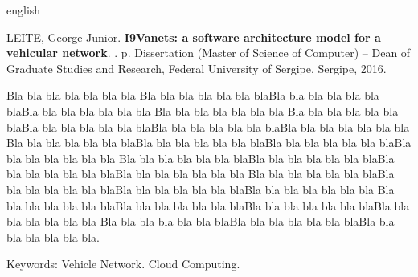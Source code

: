 \documentclass[
	12pt,				%
	oneside,			%
	a4paper,			%
	english,			%
	brazil				%
	]{abntex2ppgsi}
\begin{document}
% 
% 
\begin{resumo}[Abstract]
\begin{otherlanguage*}{english}

% 
%
%
%
\begin{flushleft}
LEITE, George Junior. \textbf{I9Vanets: a software architecture model for a vehicular network}. \imprimirdata. \pageref{LastPage} p. Dissertation (Master of Science of Computer) – Dean of Graduate Studies and Research, Federal University of Sergipe, Sergipe, 2016. 
\end{flushleft}

Bla bla bla bla bla bla bla Bla bla bla bla bla bla blaBla bla bla bla bla bla blaBla bla bla bla bla bla bla Bla bla bla bla bla bla bla Bla bla bla bla bla bla blaBla bla bla bla bla bla blaBla bla bla bla bla bla blaBla bla bla bla bla bla bla Bla bla bla bla bla bla blaBla bla bla bla bla bla blaBla bla bla bla bla bla blaBla bla bla bla bla bla bla Bla bla bla bla bla bla blaBla bla bla bla bla bla blaBla bla bla bla bla bla blaBla bla bla bla bla bla bla Bla bla bla bla bla bla blaBla bla bla bla bla bla blaBla bla bla bla bla bla blaBla bla bla bla bla bla bla Bla bla bla bla bla bla blaBla bla bla bla bla bla blaBla bla bla bla bla bla blaBla bla bla bla bla bla bla Bla bla bla bla bla bla blaBla bla bla bla bla bla blaBla bla bla bla bla bla bla.

Keywords: Vehicle Network. Cloud Computing.
\end{otherlanguage*}
\end{resumo}

\listoffigures*
\cleardoublepage
\end{document}
